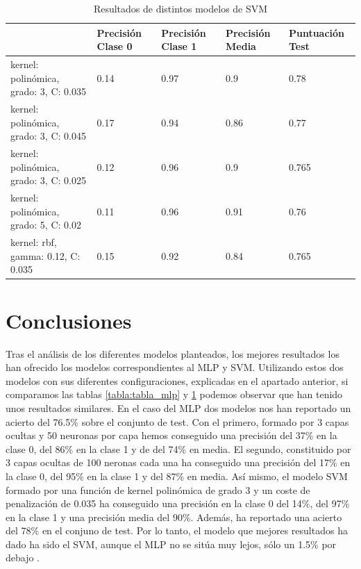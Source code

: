 \documentclass[journal,twoside]{JoPhA}
\begin{document}
	\begin{table}[htb!]
		\begin{center}
			\caption{Resultados de distintos modelos de SVM}
			\begin{tabular}{| m{2.1cm} | m{1cm} | m{1cm} | m{1cm} | m{1.2cm} |}
				\hline
				& Precisión Clase 0 & Precisión Clase 1 & Precisión Media & Puntuación Test   \\ \hline
				kernel: polinómica, grado: 3, C: 0.035 & 0.14                & 0.97                & 0.9              & 0.78  \\ \hline
				kernel: polinómica, grado: 3, C: 0.045 & 0.17                & 0.94               & 0.86             & 0.77  \\ \hline
				kernel: polinómica, grado: 3, C: 0.025 & 0.12 & 0.96 & 0.9 & 0.765 \\ \hline
				kernel: polinómica, grado: 5, C: 0.02 & 0.11 & 0.96 & 0.91 & 0.76	\\ \hline
				kernel: rbf, gamma: 0.12, C: 0.035 & 0.15 & 0.92 & 0.84 & 0.765 \\ \hline
				
			\end{tabular}
			
			\label{tabla:tabla_svm}
		\end{center}
	\end{table}

\section{Conclusiones}
Tras el análisis de los diferentes modelos planteados, los mejores resultados los han ofrecido los modelos correspondientes al MLP y SVM. Utilizando estos dos modelos con sus diferentes configuraciones, explicadas en el apartado anterior, si comparamos las tablas \ref{tabla:tabla_mlp} y \ref{tabla:tabla_svm} podemos observar que han tenido unos resultados similares. En el caso del MLP dos modelos nos han reportado un acierto del 76.5\% sobre el conjunto de test. Con el primero, formado por 3 capas ocultas y 50 neuronas por capa hemos conseguido una precisión del 37\% en la clase 0, del 86\% en la clase 1 y de del 74\% en media. El segundo, constituido por 3 capas ocultas de 100 neronas cada una ha conseguido una precisión del 17\% en la clase 0, del 95\% en la clase 1 y del 87\% en media. Así mismo, el modelo SVM formado por una función de kernel polinómica de grado 3 y un coste de penalización de 0.035 ha conseguido una precisión en la clase 0 del 14\%, del 97\% en la clase 1 y una precisión media del 90\%. Además, ha reportado una acierto del 78\% en el conjuno de test. Por lo tanto, el modelo que mejores resultados ha dado ha sido el SVM, aunque el MLP no se sitúa muy lejos, sólo un 1.5\% por debajo .\\
\end{document}
